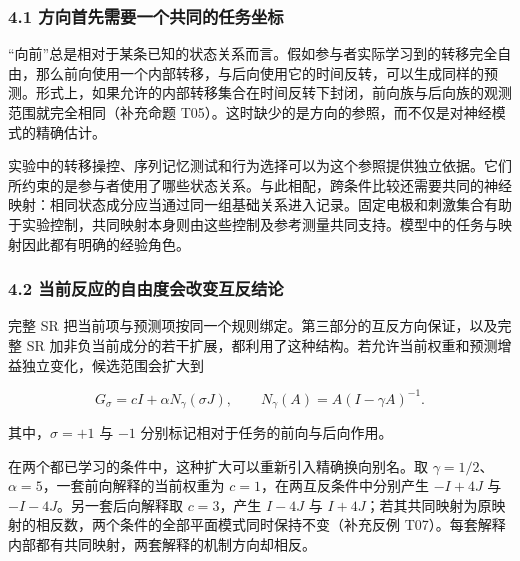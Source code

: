 \documentclass[11pt,a4paper]{article}
\begin{document}
\subsubsection{4.1
方向首先需要一个共同的任务坐标}\label{ux65b9ux5411ux9996ux5148ux9700ux8981ux4e00ux4e2aux5171ux540cux7684ux4efbux52a1ux5750ux6807}

“向前”总是相对于某条已知的状态关系而言。假如参与者实际学习到的转移完全自由，那么前向使用一个内部转移，与后向使用它的时间反转，可以生成同样的预测。形式上，如果允许的内部转移集合在时间反转下封闭，前向族与后向族的观测范围就完全相同（补充命题
T05）。这时缺少的是方向的参照，而不仅是对神经模式的精确估计。

实验中的转移操控、序列记忆测试和行为选择可以为这个参照提供独立依据。它们所约束的是参与者使用了哪些状态关系。与此相配，跨条件比较还需要共同的神经映射：相同状态成分应当通过同一组基础关系进入记录。固定电极和刺激集合有助于实验控制，共同映射本身则由这些控制及参考测量共同支持。模型中的任务与映射因此都有明确的经验角色。

\subsubsection{4.2
当前反应的自由度会改变互反结论}\label{ux5f53ux524dux53cdux5e94ux7684ux81eaux7531ux5ea6ux4f1aux6539ux53d8ux4e92ux53cdux7ed3ux8bba}

\par
\noindent\begin{minipage}{\linewidth}

完整 SR
把当前项与预测项按同一个规则绑定。第三部分的互反方向保证，以及完整 SR
加非负当前成分的若干扩展，都利用了这种结构。若允许当前权重和预测增益独立变化，候选范围会扩大到

\[
G_\sigma=cI+\alpha N_\gamma(\sigma J),
\qquad N_\gamma(A)=A(I-\gamma A)^{-1}.
\]

\end{minipage}\par

其中，\(\sigma=+1\) 与 \(-1\) 分别标记相对于任务的前向与后向作用。

在两个都已学习的条件中，这种扩大可以重新引入精确换向别名。取
\(\gamma=1/2\)、\(\alpha=5\)，一套前向解释的当前权重为
\(c=1\)，在两互反条件中分别产生 \(-I+4J\) 与 \(-I-4J\)。另一套后向解释取
\(c=3\)，产生 \(I-4J\) 与
\(I+4J\)；若其共同映射为原映射的相反数，两个条件的全部平面模式同时保持不变（补充反例
T07）。每套解释内部都有共同映射，两套解释的机制方向却相反。
\end{document}
